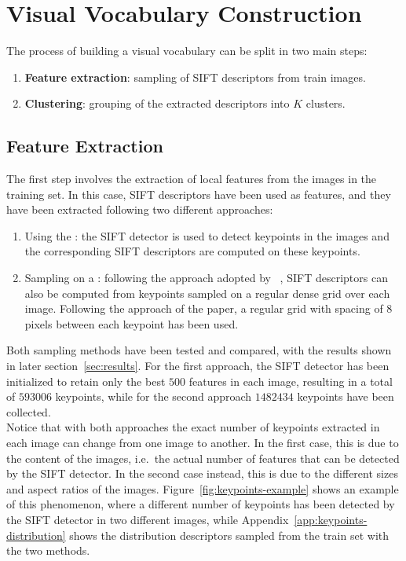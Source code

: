 \documentclass[../main.tex]{subfiles}
\begin{document}
\section{Visual Vocabulary Construction}\label{sec:visual-vocabulary-construction}

The process of building a visual vocabulary can be split in two main steps: 

\begin{enumerate}
  \item \textbf{Feature extraction}: sampling of SIFT descriptors from train images.
  \item \textbf{Clustering}: grouping of the extracted descriptors into $K$ clusters.
\end{enumerate}

\subsection{Feature Extraction}\label{subsec:feature-extraction}

The first step involves the extraction of local features from the images in the
training set. In this case, SIFT descriptors have been used as features, and they
have been extracted following two different approaches:

\begin{enumerate}
  \item Using the : the SIFT detector is used to detect keypoints in the images and the corresponding SIFT descriptors are computed on these keypoints.
  \item Sampling on a : following the approach adopted
	  by ~\cite{lazebnik}, SIFT descriptors can also be
	  computed from keypoints sampled on a regular dense grid over each image.
	  Following the approach of the paper, a regular grid with spacing of $8$ pixels between each keypoint has been used.
\end{enumerate}

Both sampling methods have been tested and compared, with the results shown in
later section~\ref{sec:results}. 
For the first approach, the SIFT detector has
been initialized to retain only the best $500$ features in each image, resulting in a total of $\num{593006}$ keypoints, while for the second approach $\num{1482434}$ keypoints have been collected.\\
Notice that with both approaches the exact number of keypoints extracted in each
image can change from one image to another.
In the first case, this is due to
the content of the images, i.e.\ the actual number of features that can be
detected by the SIFT detector.
In the second case instead, this is due to the different sizes and aspect ratios of the images. 
Figure~\ref{fig:keypoints-example} shows an example of this phenomenon, where a
different number of keypoints has been detected by the SIFT detector in two
different images, while Appendix~\ref{app:keypoints-distribution} shows the
distribution descriptors sampled from the train set with the two methods.
\end{document}
